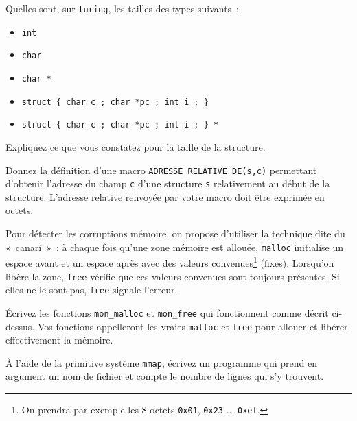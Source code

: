%



\question

Quelles sont, sur \texttt {turing}, les tailles des types suivants~:
\begin {itemize}
    \item \texttt {int}
    \item \texttt {char}
    \item \texttt {char *}
    \item \verb|struct { char c ; char *pc ; int i ; }|
    \item \verb|struct { char c ; char *pc ; int i ; } *|
\end {itemize}

Expliquez ce que vous constatez pour la taille de la structure.


\question

Donnez la définition d'une macro \verb|ADRESSE_RELATIVE_DE(s,c)|
permettant d'obtenir l'adresse du champ \texttt {c} d'une structure
\texttt {s} relativement au début de la structure. L'adresse relative
renvoyée par votre macro doit être exprimée en octets.


\question

Pour détecter les corruptions mémoire, on propose d'utiliser la
technique dite du «~canari~»~: à chaque fois qu'une zone mémoire est
allouée, \texttt {malloc} initialise un espace avant et un espace après
avec des valeurs convenues\footnote {On prendra par exemple les 8 octets
\texttt {0x01}, \texttt {0x23} ... \texttt {0xef}.}
(fixes).  Lorsqu'on libère la zone, \texttt {free} vérifie que ces
valeurs convenues sont toujours présentes. Si elles ne le sont pas,
\texttt {free} signale l'erreur.

Écrivez les fonctions \texttt {mon\_malloc} et \texttt {mon\_free}
qui fonctionnent comme décrit ci-dessus. Vos fonctions appelleront
les vraies \texttt {malloc} et \texttt {free} pour allouer et libérer
effectivement la mémoire.


\question

À l'aide de la primitive système \texttt {mmap}, écrivez un programme
qui prend en argument un nom de fichier et compte le nombre de lignes
qui s'y trouvent.


\question

